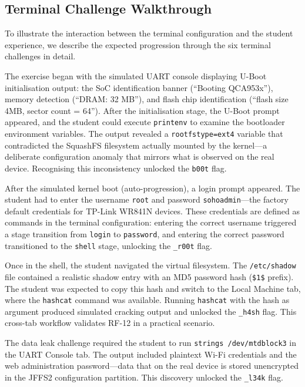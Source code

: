 \subsection{Terminal Challenge Walkthrough}\label{subsec:walkthrough}

To illustrate the interaction between the terminal configuration and the student experience, we describe the expected progression through the six terminal challenges in detail.

The exercise began with the simulated UART console displaying U-Boot initialisation output: the SoC identification banner (``Booting QCA953x''), memory detection (``DRAM: 32 MB''), and flash chip identification (``flash size 4MB, sector count = 64''). After the initialisation stage, the U-Boot prompt appeared, and the student could execute \texttt{printenv} to examine the bootloader environment variables. The output revealed a \texttt{rootfstype=ext4} variable that contradicted the SquashFS filesystem actually mounted by the kernel---a deliberate configuration anomaly that mirrors what is observed on the real device. Recognising this inconsistency unlocked the \texttt{b00t} flag.

After the simulated kernel boot (auto-progression), a login prompt appeared. The student had to enter the username \texttt{root} and password \texttt{sohoadmin}---the factory default credentials for TP-Link WR841N devices. These credentials are defined as commands in the terminal configuration: entering the correct username triggered a stage transition from \texttt{login} to \texttt{password}, and entering the correct password transitioned to the \texttt{shell} stage, unlocking the \texttt{\_r00t} flag.

Once in the shell, the student navigated the virtual filesystem. The \texttt{/etc/shadow} file contained a realistic shadow entry with an MD5 password hash (\texttt{\$1\$} prefix). The student was expected to copy this hash and switch to the Local Machine tab, where the \texttt{hashcat} command was available. Running \texttt{hashcat} with the hash as argument produced simulated cracking output and unlocked the \texttt{\_h4sh} flag. This cross-tab workflow validates RF-12 in a practical scenario.

The data leak challenge required the student to run \texttt{strings /dev/mtdblock3} in the UART Console tab. The output included plaintext Wi-Fi credentials and the web administration password---data that on the real device is stored unencrypted in the JFFS2 configuration partition. This discovery unlocked the \texttt{\_l34k} flag.

